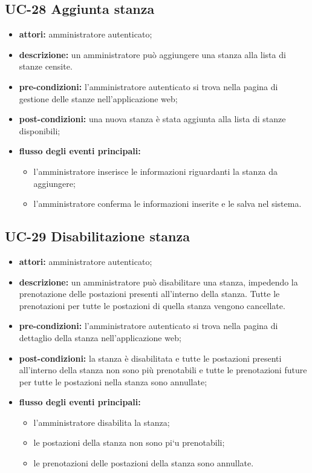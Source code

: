 \subsection{UC-28 Aggiunta stanza}
\begin{itemize}
    \item \textbf{attori:} amministratore autenticato;
    \item \textbf{descrizione:} un amministratore pu\`{o} aggiungere una stanza alla lista di stanze censite.
    \item \textbf{pre-condizioni:} l'amministratore autenticato si trova nella pagina di gestione delle stanze nell'applicazione web;
    \item \textbf{post-condizioni:} una nuova stanza \`{e} stata aggiunta alla lista di stanze disponibili;
    \item \textbf{flusso degli eventi principali:}
    \begin{itemize}
        \item l'amministratore inserisce le informazioni riguardanti la stanza da aggiungere;
        \item l'amministratore conferma le informazioni inserite e le salva nel sistema.
    \end{itemize}
\end{itemize}


\subsection{UC-29 Disabilitazione stanza}
\begin{itemize}
    \item \textbf{attori:} amministratore autenticato;
    \item \textbf{descrizione:} un amministratore pu\`{o} disabilitare una stanza, impedendo la prenotazione delle postazioni presenti all'interno della stanza. Tutte le prenotazioni per tutte le postazioni di quella stanza vengono cancellate.
    \item \textbf{pre-condizioni:} l'amministratore autenticato si trova nella pagina di dettaglio della stanza nell'applicazione web;
    \item \textbf{post-condizioni:} la stanza \`{e} disabilitata e tutte le postazioni presenti all'interno della stanza non sono pi\`{u} prenotabili e tutte le prenotazioni future per tutte le postazioni nella stanza sono annullate;
    \item \textbf{flusso degli eventi principali:}
    \begin{itemize}
        \item l'amministratore disabilita la stanza;
        \item le postazioni della stanza non sono pi`{u} prenotabili;
        \item le prenotazioni delle postazioni della stanza sono annullate.
    \end{itemize}
\end{itemize}


